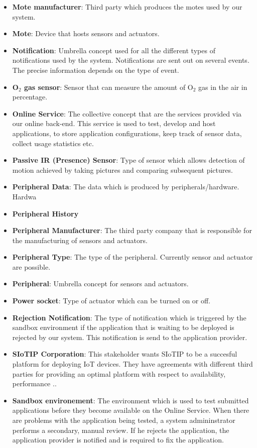 \documentclass[english]{sareport}
\begin{document}
\begin{itemize}
	\item \textbf{Mote manufacturer}: Third party which produces the motes used by our system.
	\item \textbf{Mote}: Device that hosts sensors and actuators.
	\item \textbf{Notification}: Umbrella concept used for all the different types of notifications used by the system. Notifications are sent out on several events. The precise information depends on the type of event.
	\item \textbf{O$_2$ gas sensor}: Sensor that can measure the amount of O$_2$ gas in the air  in percentage.
	\item \textbf{Online Service}: The collective concept that are the services provided via our online back-end. This service is used to test, develop and host applications, to store application configurations, keep track of sensor data, collect usage statistics etc. 
	\item \textbf{Passive IR (Presence) Sensor}: Type of sensor which allows detection of motion achieved by taking pictures and comparing subsequent pictures.
	\item \textbf{Peripheral Data}: The data which is produced by peripherals/hardware. Hardwa
	\item \textbf{Peripheral History}
	\item \textbf{Peripheral Manufacturer}: The third party company that is responsible for the manufacturing of sensors and actuators.
	\item \textbf{Peripheral Type}: The type of the peripheral. Currently sensor and actuator are possible.
	\item \textbf{Peripheral}: Umbrella concept for sensors and actuators.
	\item \textbf{Power socket}: Type of actuator which can be turned on or off.
	\item \textbf{Rejection Notification}: The type of notification which is triggered by the sandbox environment if the application that is waiting to be deployed is rejected by our system. This notification is send to the application provider.
	\item \textbf{SIoTIP Corporation}: This stakeholder wants SIoTIP to be a succesful platform for deploying IoT devices. They have agreements with different third parties for providing an optimal platform with respect to availability, performance ..
	\item \textbf{Sandbox environement}: The environment which is used to test submitted applications before they become available on the Online Service. When there are problems with the application being tested, a system admininstrator performs a secondary, manual review. If he rejects the application, the application provider is notified and is required to fix the application.

\end{itemize}
\end{document}
